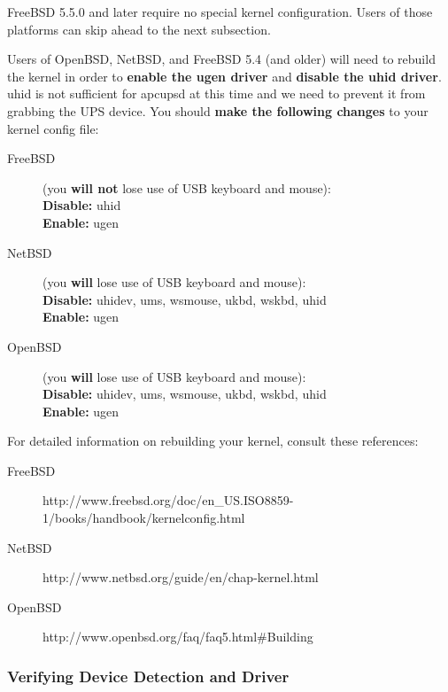 FreeBSD 5.5.0 and later require no special kernel configuration. Users of
those platforms can skip ahead to the next subsection.

Users of OpenBSD, NetBSD, and FreeBSD 5.4 (and older) will need to rebuild
the kernel in order to {\bf enable the ugen driver} and {\bf disable the 
uhid driver}. uhid is not sufficient for apcupsd at this time and we need 
to prevent it from grabbing the UPS device. You should {\bf make the 
following changes} to your kernel config file:

\begin{description}
\item [FreeBSD]
(you {\bf will not} lose use of USB keyboard and mouse):
\\{\bf Disable:} uhid
\\{\bf Enable:} ugen

\item [NetBSD] (you {\bf will} lose use of USB keyboard and mouse):
\\{\bf Disable:} uhidev, ums, wsmouse, ukbd, wskbd, uhid  
\\{\bf Enable:} ugen

\item [OpenBSD] (you {\bf will} lose use of USB keyboard and mouse):
\\{\bf Disable:} uhidev, ums, wsmouse, ukbd, wskbd, uhid  
\\{\bf Enable:} ugen
\end{description}

For detailed information on rebuilding your kernel, consult these references: 

\begin{description}
\item [FreeBSD]
      {http://www.freebsd.org/doc/en\_US.ISO8859-1/books/handbook/kernelconfig.html}
\item [NetBSD]
      {http://www.netbsd.org/guide/en/chap-kernel.html}
\item [OpenBSD]
      {http://www.openbsd.org/faq/faq5.html\#Building}
\end{description}

\subsubsection*{Verifying Device Detection and Driver}

